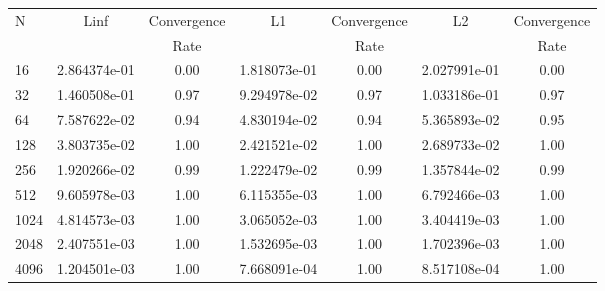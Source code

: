 \documentclass[12pt]{article}
\begin{document}
	\begin{tabular}{l|c|c|c|c|c|c}
		N&Linf&Convergence&L1&Convergence&L2&Convergence\\
		&&Rate&&Rate&&Rate\\
		\hline
		16&2.864374e-01&0.00&1.818073e-01&0.00&2.027991e-01&0.00\\
		\hline
		32&1.460508e-01&0.97&9.294978e-02&0.97&1.033186e-01&0.97\\
		\hline
		64&7.587622e-02&0.94&4.830194e-02&0.94&5.365893e-02&0.95\\
		\hline
		128&3.803735e-02&1.00&2.421521e-02&1.00&2.689733e-02&1.00\\
		\hline
		256&1.920266e-02&0.99&1.222479e-02&0.99&1.357844e-02&0.99\\
		\hline
		512&9.605978e-03&1.00&6.115355e-03&1.00&6.792466e-03&1.00\\
		\hline
		1024&4.814573e-03&1.00&3.065052e-03&1.00&3.404419e-03&1.00\\
		\hline
		2048&2.407551e-03&1.00&1.532695e-03&1.00&1.702396e-03&1.00\\
		\hline
		4096&1.204501e-03&1.00&7.668091e-04&1.00&8.517108e-04&1.00\\
	\end{tabular}
\end{document}

